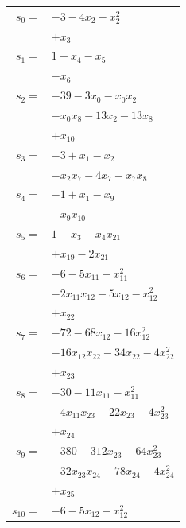 \begingroup
\small
\setlength{\tabcolsep}{2pt}
\setlength{\LTleft}{0pt}
\begin{longtable}{@{}r@{\;}l@{}}
\(s_{0}=\) & \(\displaystyle -3 -4x_{2} -x_{2}^{2}\) \\
 & \(\displaystyle +x_{3}\) \\[3pt]
\(s_{1}=\) & \(\displaystyle 1 +x_{4} -x_{5}\) \\
 & \(\displaystyle -x_{6}\) \\[3pt]
\(s_{2}=\) & \(\displaystyle -39 -3x_{0} -x_{0}x_{2}\) \\
 & \(\displaystyle -x_{0}x_{8} -13x_{2} -13x_{8}\) \\
 & \(\displaystyle +x_{10}\) \\[3pt]
\(s_{3}=\) & \(\displaystyle -3 +x_{1} -x_{2}\) \\
 & \(\displaystyle -x_{2}x_{7} -4x_{7} -x_{7}x_{8}\) \\[3pt]
\(s_{4}=\) & \(\displaystyle -1 +x_{1} -x_{9}\) \\
 & \(\displaystyle -x_{9}x_{10}\) \\[3pt]
\(s_{5}=\) & \(\displaystyle 1 -x_{3} -x_{4}x_{21}\) \\
 & \(\displaystyle +x_{19} -2x_{21}\) \\[3pt]
\(s_{6}=\) & \(\displaystyle -6 -5x_{11} -x_{11}^{2}\) \\
 & \(\displaystyle -2x_{11}x_{12} -5x_{12} -x_{12}^{2}\) \\
 & \(\displaystyle +x_{22}\) \\[3pt]
\(s_{7}=\) & \(\displaystyle -72 -68x_{12} -16x_{12}^{2}\) \\
 & \(\displaystyle -16x_{12}x_{22} -34x_{22} -4x_{22}^{2}\) \\
 & \(\displaystyle +x_{23}\) \\[3pt]
\(s_{8}=\) & \(\displaystyle -30 -11x_{11} -x_{11}^{2}\) \\
 & \(\displaystyle -4x_{11}x_{23} -22x_{23} -4x_{23}^{2}\) \\
 & \(\displaystyle +x_{24}\) \\[3pt]
\(s_{9}=\) & \(\displaystyle -380 -312x_{23} -64x_{23}^{2}\) \\
 & \(\displaystyle -32x_{23}x_{24} -78x_{24} -4x_{24}^{2}\) \\
 & \(\displaystyle +x_{25}\) \\[3pt]
\(s_{10}=\) & \(\displaystyle -6 -5x_{12} -x_{12}^{2}\) \\

\end{longtable}
